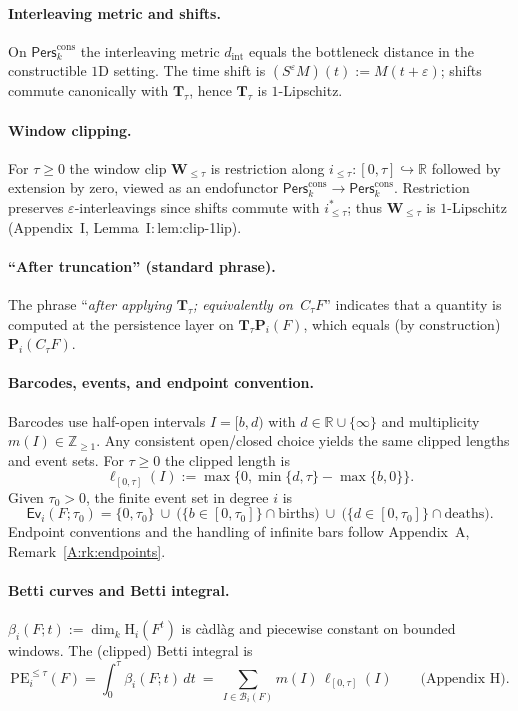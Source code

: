 \documentclass[11pt]{article}
\DeclareRobustCommand{\hyp}{\nobreakdash-}
\newcommand{\Pers}{\mathsf{Pers}}
\numberwithin{equation}{section}
\theoremstyle{definition}
\DeclareRobustCommand{\Perskft}{\Pers^{\mathrm{cons}}_{k}}
\begin{document}
\paragraph{Interleaving metric and shifts.}
On \(\Perskft\) the interleaving metric \(d_{\mathrm{int}}\) equals the bottleneck distance in the constructible \(1\)D setting.
The time shift is \((S^\varepsilon M)(t):=M(t+\varepsilon)\); shifts commute canonically with \(\mathbf{T}_\tau\), hence \(\mathbf{T}_\tau\) is \(1\)\hyp Lipschitz.

\paragraph{Window clipping.}
For \(\tau\ge 0\) the window clip \(\mathbf{W}_{\le\tau}\) is restriction along \(i_{\le\tau}:[0,\tau]\hookrightarrow\mathbb{R}\) followed by extension by zero, viewed as an endofunctor \(\Perskft\to\Perskft\).
Restriction preserves \(\varepsilon\)\hyp interleavings since shifts commute with \(i_{\le\tau}^\ast\); thus \(\mathbf{W}_{\le\tau}\) is \(1\)\hyp Lipschitz (Appendix~I, Lemma~I:\,lem:clip-1lip).

\paragraph{“After truncation” (standard phrase).}
The phrase “\emph{after applying \(\mathbf{T}_\tau\); equivalently on \(\,C_\tau F\)}” indicates that a quantity is computed at the persistence layer on \(\mathbf{T}_\tau\mathbf{P}_i(F)\), which equals (by construction) \(\mathbf{P}_i(C_\tau F)\).

\paragraph{Barcodes, events, and endpoint convention.}
Barcodes use half\hyp open intervals \(I=[b,d)\) with \(d\in\mathbb{R}\cup\{\infty\}\) and multiplicity \(m(I)\in\mathbb{Z}_{\ge1}\).
Any consistent open/closed choice yields the same clipped lengths and event sets.
For \(\tau\ge 0\) the clipped length is
\[
\ell_{[0,\tau]}(I):=\max\{0,\min\{d,\tau\}-\max\{b,0\}\}.
\]
Given \(\tau_0>0\), the finite event set in degree \(i\) is
\[
\mathsf{Ev}_i(F;\tau_0)=\{0,\tau_0\}\ \cup\ \bigl(\{b\in[0,\tau_0]\}\cap\mathrm{births}\bigr)\ \cup\ \bigl(\{d\in[0,\tau_0]\}\cap\mathrm{deaths}\bigr).
\]
Endpoint conventions and the handling of infinite bars follow Appendix~A, Remark~\ref{A:rk:endpoints}.

\paragraph{Betti curves and Betti integral.}
\(\beta_i(F;t):=\dim_k \mathrm{H}_i(F^t)\) is c\`adl\`ag and piecewise constant on bounded windows.
The (clipped) Betti integral is
\[
\mathrm{PE}_i^{\le\tau}(F)=\int_0^\tau \beta_i(F;t)\,dt\ =\ \sum_{I\in\mathcal{B}_i(F)} m(I)\,\ell_{[0,\tau]}(I)\qquad\text{(Appendix~H).}
\]
\end{document}
